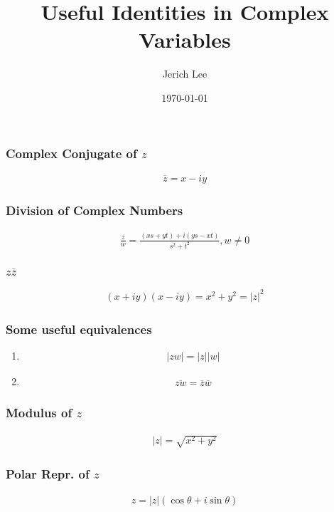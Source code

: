\documentclass[9pt]{article}
\title{Useful Identities in Complex Variables}
\author{Jerich Lee}
\date{\today}
\theoremstyle{definition} %
\theoremstyle{plain} %
\begin{document}
\maketitle
\subsubsection*{Complex Conjugate of $z$}
\begin{align}
    \overline{z} = x-iy
\end{align}
\subsubsection*{Division of Complex Numbers}
\begin{align}
    \frac{z}{w}= \frac{(xs+yt)+i(ys-xt)}{s^{2}+t^{2}}, w \neq 0
\end{align}
\subsubsection*{$z\overline{z}$}
\begin{align}
    \left( x+iy \right)\left( x-iy \right)=x^{2}+y^{2}=\left\vert z \right\vert ^{2}  
\end{align}
\subsubsection*{Some useful equivalences}
\noindent
\begin{enumerate}
    \item \begin{align}
    \left\vert zw \right\vert = \left\vert z \right\vert \left\vert w \right\vert 
    \end{align}
    \item \begin{align}
        \overline{zw}= \overline{z} \overline{w}  
    \end{align}
\end{enumerate}
\subsubsection*{Modulus of $z$}
\begin{align}
    \left\vert z \right\vert = \sqrt{x^{2}+y^{2}} 
\end{align}
\subsubsection*{Polar Repr. of $z$}
\begin{align}
    z = \left\vert z \right\vert \left( \cos \theta+ i \sin \theta \right) 
\end{align}
\end{document}

